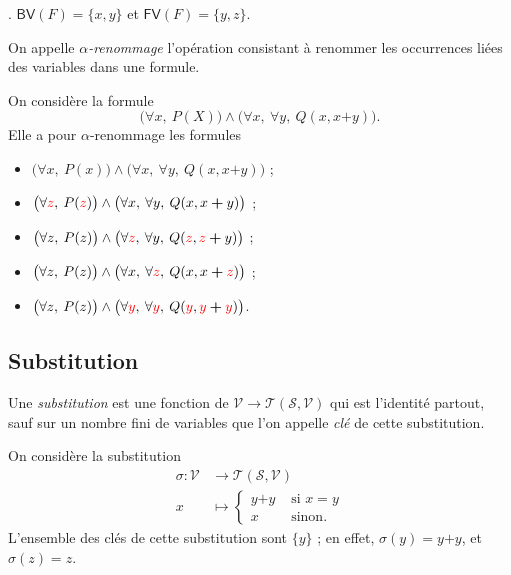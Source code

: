 \begin{exm}
	.
	$\textsf{BV}(F) = \{x,y\}$\/ et $\textsf{FV}(F) = \{y,z\}$.
\end{exm}

\begin{defn}
	On appelle \textit{$\alpha$-renommage} l'opération consistant à renommer les occurrences liées des variables dans une formule.
\end{defn}

\begin{exm}
	On considère la formule \[
		\big(\forall x,\: P(X)\big) \land \big(\forall x,\: \forall y,\: Q(x, x \mathbf{+} y)\big)
	.\]
	Elle a pour $\alpha$-renommage les formules 
	\begin{itemize}
		\item $\big(\forall x,\: P(x)\big) \land \big(\forall x,\: \forall y,\: Q(x, x \mathbf{+} y)\big)$ ;
		\item $\big(\forall {\color{red}z},\: P({\color{red}z})\big) \land \big(\forall x,\: \forall y,\: Q(x, x \bm{+} y)\big)$ ;
		\item $\big(\forall z,\: P(z)\big) \land \big(\forall {\color{red}z},\: \forall y,\: Q({\color{red}z}, {\color{red}z} \bm{+} y)\big)$ ;
		\item $\big(\forall z,\: P(z)\big) \land \big(\forall x,\: \forall {\color{red}z},\: Q(x, x \bm{+} {\color{red}z})\big)$ ;
		\item \st{$\big(\forall z,\: P(z)\big) \land \big(\forall {\color{red}y},\: \forall {\color{red}y},\: Q({\color{red}y}, {\color{red}y} \bm{+} {\color{red}y})\big)$}.
	\end{itemize}
\end{exm}

\subsection{Substitution}

\begin{defn}[Substitution]
	Une \textit{substitution} est une fonction de $\mathcal{V} \longrightarrow \mathcal{T}(\mathcal{S}, \mathcal{V})$\/ qui est l'identité partout, sauf sur un nombre fini de variables que l'on appelle \textit{clé} de cette substitution.
\end{defn}

\begin{exm}
	On considère la substitution \begin{align*}
		\sigma: \mathcal{V} &\longrightarrow \mathcal{T}(\mathcal{S}, \mathcal{V}) \\
		x &\longmapsto 
		\begin{cases}
			y \mathbf{+} y &\text{ si } x = y\\
			x &\text{ sinon}.
		\end{cases}
	\end{align*}
	L'ensemble des clés de cette substitution sont $\{y\}$ ; en effet, $\sigma(y) = y \mathbf{+} y$, et $\sigma(z) = z$.
\end{exm}


